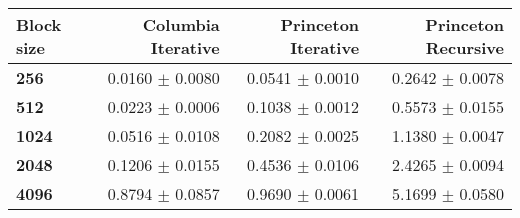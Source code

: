 \begin{tabular}{lrrr}\toprule
\textbf{Block size}  & \textbf{Columbia Iterative} & \textbf{Princeton Iterative} & \textbf{Princeton Recursive}\\\midrule
\textbf{256}  & 0.0160 $\pm$ 0.0080 & 0.0541 $\pm$ 0.0010 & 0.2642 $\pm$ 0.0078\\
\textbf{512}  & 0.0223 $\pm$ 0.0006 & 0.1038 $\pm$ 0.0012 & 0.5573 $\pm$ 0.0155\\
\textbf{1024}  & 0.0516 $\pm$ 0.0108 & 0.2082 $\pm$ 0.0025 & 1.1380 $\pm$ 0.0047\\
\textbf{2048}  & 0.1206 $\pm$ 0.0155 & 0.4536 $\pm$ 0.0106 & 2.4265 $\pm$ 0.0094\\
\textbf{4096} & 0.8794 $\pm$ 0.0857 & 0.9690 $\pm$ 0.0061 & 5.1699 $\pm$ 0.0580\\
\bottomrule
\end{tabular}

